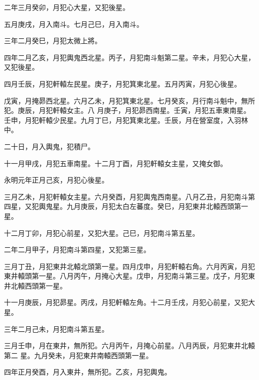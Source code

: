 \begin{pinyinscope}
 二年三月癸卯，月犯心大星，又犯後星。



 五月庚戌，月入南斗。七月己巳，月入南斗。



 三年二月癸巳，月犯太微上將。



 四年二月乙亥，月犯輿鬼西北星。丙子，月犯南斗魁第二星。辛未，月犯心大星，又犯後星。



 四月壬辰，月犯軒轅左民星。庚子，月犯箕東北星。五月丙寅，月犯心後星。



 戊寅，月掩昴西北星。六月乙未，月犯箕東北星。七月癸亥，月行南斗魁中，無所犯。庚辰，月犯軒轅女主。八
 月庚子，月犯昴西南星。壬寅，月犯五車東南星。壬申，月犯軒轅少民星。九月丁巳，月犯箕東北星。壬辰，月在營室度，入羽林中。



 二十日，月入輿鬼，犯積尸。



 十一月甲戌，月犯五車南星。十二月丁酉，月犯軒轅女主星，又掩女御。



 永明元年正月己亥，月犯心後星。



 三月乙未，月犯軒轅女主星。六月癸酉，月犯輿鬼西南星。八月乙丑，月犯南斗第四星，又犯輿鬼星。九月庚辰，月犯太白左蕃度。癸巳，月犯東井北轅西頭第一星。



 十二月丁卯，月犯心前星，又犯大星。己巳，月犯南斗第五星。



 二年二月甲子，月犯南斗第四星，又犯第三星。



 三月丁丑，月犯東井北轅北頭第一星。四月戊申，月犯軒轅右角。六月丙寅，月犯東井轅頭第一星。八月丙午，月掩心大星。戊申，月犯南斗第三星。戊子，月犯東井北轅西頭第一星。



 十一月庚辰，月犯昴星。丙戌，月犯軒轅左角。十二月壬戌，月犯心前星，又犯大星。



 三年二月己未，月犯南斗第五星。



 三月壬申，月在東井，無所犯。六月丙午，月掩心前星。八月丙辰，月犯東井北轅第二
 星。九月癸未，月犯東井南轅西頭第一星。



 四年正月癸酉，月入東井，無所犯。乙亥，月犯輿鬼。




\end{pinyinscope}
